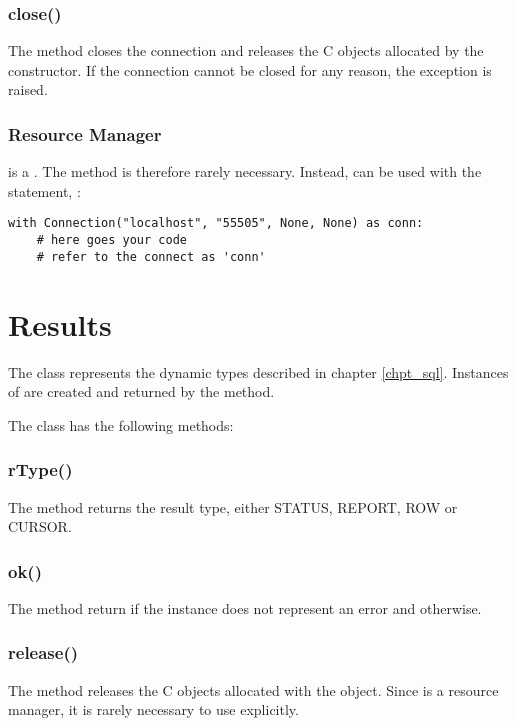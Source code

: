 \subsubsection{close()}
The method closes the connection and
releases the C objects allocated by
the constructor. If the connection
cannot be closed for any reason,
the exception  is raised.

\subsubsection{Resource Manager}
 is a .
The method  is therefore
rarely necessary. Instead,  can
be used with the  statement, \ie:

\begin{python}
\begin{lstlisting}
with Connection("localhost", "55505", None, None) as conn:
    # here goes your code
    # refer to the connect as 'conn'
\end{lstlisting}
\end{python}

\section{Results}
The  class represents
the dynamic types described in chapter \ref{chpt_sql}.
Instances of  are
created and returned by
the  method.

The  class has the following methods:

\subsubsection{rType()}
The method returns the result type,
either STATUS, REPORT, ROW or CURSOR.

\subsubsection{ok()}
The method return 
if the instance does not represent
an error and  otherwise.

\subsubsection{release()}
The method releases the C objects
allocated with the  object.
Since  is a resource manager,
it is rarely necessary to use explicitly.

